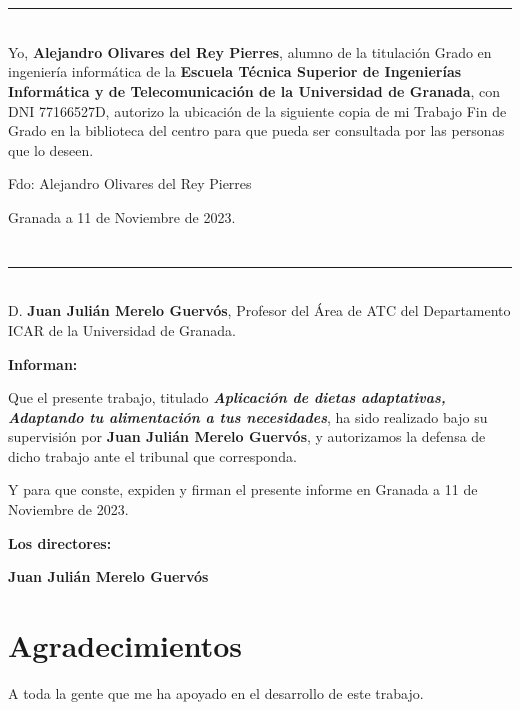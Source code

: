 \chapter*{}
\thispagestyle{empty}

\noindent\rule[-1ex]{\textwidth}{2pt}\\[4.5ex]

Yo, \textbf{Alejandro Olivares del Rey Pierres}, alumno de la titulación Grado en ingeniería informática de la \textbf{Escuela Técnica Superior
de Ingenierías Informática y de Telecomunicación de la Universidad de Granada}, con DNI 77166527D, autorizo la
ubicación de la siguiente copia de mi Trabajo Fin de Grado en la biblioteca del centro para que pueda ser
consultada por las personas que lo deseen.

\vspace{6cm}

\noindent Fdo: Alejandro Olivares del Rey Pierres

\vspace{2cm}

\begin{flushright}
Granada a 11 de Noviembre de 2023.
\end{flushright}


\chapter*{}
\thispagestyle{empty}

\noindent\rule[-1ex]{\textwidth}{2pt}\\[4.5ex]

D. \textbf{Juan Julián Merelo Guervós}, Profesor del Área de ATC del Departamento ICAR de la Universidad de Granada.

\vspace{0.5cm}

\textbf{Informan:}

\vspace{0.5cm}

Que el presente trabajo, titulado \textit{\textbf{Aplicación de dietas adaptativas,  Adaptando tu alimentación a tus necesidades}},
ha sido realizado bajo su supervisión por \textbf{Juan Julián Merelo Guervós}, y autorizamos la defensa de dicho trabajo ante el tribunal
que corresponda.

\vspace{0.5cm}

Y para que conste, expiden y firman el presente informe en Granada a 11 de Noviembre de 2023.

\vspace{1cm}

\textbf{Los directores:}

\vspace{5cm}

\noindent \textbf{Juan Julián Merelo Guervós}

\chapter*{Agradecimientos}
\thispagestyle{empty}

       \vspace{1cm}


A toda la gente que me ha apoyado en el desarrollo de este trabajo.

